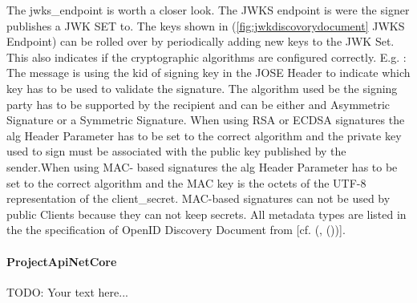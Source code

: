 The jwks\_endpoint is worth a closer look. The JWKS endpoint is were the signer publishes a JWK SET to. The keys shown in (\ref{fig:jwkdiscovorydocument} JWKS Endpoint) can be rolled over by periodically adding new keys to the JWK Set. This also indicates if the cryptographic algorithms are configured correctly. E.g. : The message is using the kid of signing key in the JOSE Header to indicate which key has to be used to validate the signature. The algorithm used be the signing party has to be supported by the recipient and can be either and Asymmetric Signature or a Symmetric Signature. 
When using RSA or ECDSA signatures the alg Header Parameter has to be set to the correct algorithm and the private key used to sign must be associated with the public key published by the sender.When using MAC- based signatures the alg Header Parameter has to be set to the correct algorithm and the MAC key is the octets of the UTF-8 representation of the client\_secret. MAC-based signatures can not be used by public Clients because they can not keep secrets.  All metadata types are listed in the the specification of OpenID Discovery Document from \cite{Sakimura:OIDCD} [cf. (\cite{Sakimura:OIDCC}, (\cite{Sakimura:OIDCD}))]. 






\paragraph{ProjectApiNetCore}



 

TODO: Your text here...

\chapterend
